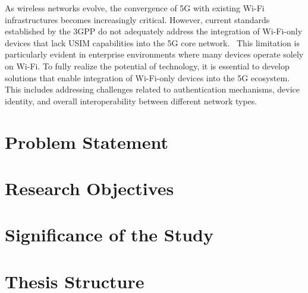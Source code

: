 As wireless networks evolve, the convergence of 5G with existing Wi-Fi infrastructures becomes increasingly critical. However, current standards established by the \ac{3GPP} do not adequately address the integration of Wi-Fi-only devices that lack \ac{USIM} capabilities into the 5G core network.~\cite{wba-04-2021} This limitation is particularly evident in enterprise environments where many devices operate solely on Wi-Fi. To fully realize the potential of  technology, it is essential to develop solutions that enable integration of Wi-Fi-only devices into the \ac{5G} ecosystem. This includes addressing challenges related to authentication mechanisms, device identity, and overall interoperability between different network types.

\section{Problem Statement}


\section{Research Objectives}


\section{Significance of the Study}


\section{Thesis Structure}


